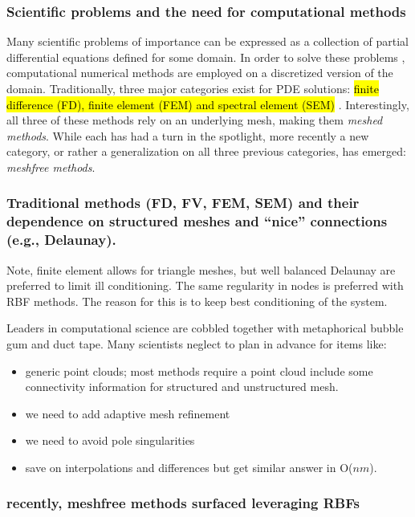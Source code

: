 \subsubsection{Scientific problems and the need for computational methods} 

Many scientific problems of importance can be expressed as a collection of partial differential equations defined for some domain. In order to solve these 
problems , computational numerical methods are employed on a discretized version of the domain. Traditionally, three major categories exist for PDE solutions: \hl{ finite difference (FD), finite element (FEM) and spectral element (SEM)} \cite{Fasshauer:2007}. Interestingly, all three of these methods rely on an underlying mesh, making them \emph{meshed methods}. While each has had a turn in the spotlight, more recently a new category, or rather a generalization on all three previous categories, has emerged: \emph{meshfree methods}. 

\subsubsection{Traditional methods (FD, FV, FEM, SEM) and their dependence on structured meshes and ``nice'' connections (e.g., Delaunay).}
Note, finite element allows for triangle meshes, but well balanced Delaunay are preferred to limit ill conditioning. The same regularity in nodes is preferred with RBF methods. The reason for this is to keep best conditioning of the system. 

Leaders in computational science are cobbled together with metaphorical bubble gum and duct tape. Many scientists neglect to plan in advance for items like: 
\begin{itemize}
\item generic point clouds; most methods require a point cloud include some connectivity information for structured and unstructured mesh. 
\item we need to add adaptive mesh refinement
\item we need to avoid pole singularities
\item save on interpolations and differences but get similar answer in O($nm$). 
\end{itemize} 

\subsubsection{ recently, meshfree methods surfaced leveraging RBFs}

